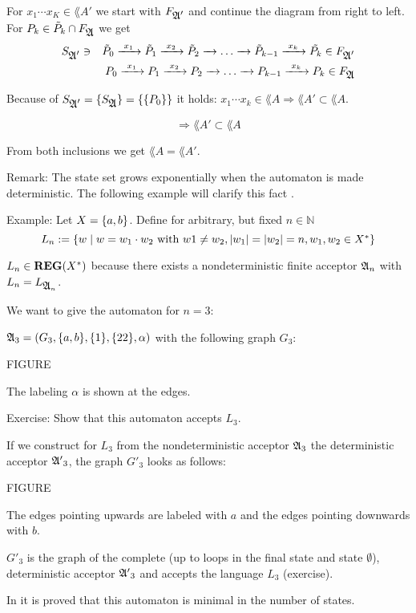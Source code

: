 For $x_1 \cdots x_K \in \lang{A'}$ we start with $F_{\mbox{$\mathfrak{A'}$}}$ and continue
the diagram from right to left. For $P_k \in \tilde{P}_k \cap F_{\mbox{$\mathfrak{A}$}}$ we get
\begin{eqnarray*}
 & S_{\mbox{$\mathfrak{A'}$}} \ni & \tilde{P}_0 \xrightarrow{\ {x_1}\ } \tilde{P}_1 \xrightarrow{\ {x_2}\ } \tilde{P}_2 \xrightarrow{\ {}\ } \ldots
 \xrightarrow{\ {}\ } \tilde{P}_{k-1} \xrightarrow{\ {x_k}\ } \tilde{P_k} \in F_{\mbox{$\mathfrak{A'}$}} \\
 & & P_0 \xrightarrow{\ {x_1}\ } P_1 \xrightarrow{\ {x_2}\ } P_2 \xrightarrow{\ {}\ } \ldots \xrightarrow{\ {}\ }
 P_{k-1} \xrightarrow{\ {x_k}\ } P_k \in F_{\mbox{$\mathfrak{A}$}} 
\end{eqnarray*}

Because of $S_{\mbox{$\mathfrak{A'}$}} = \mbox{$\{S_{\mbox{$\mathfrak{A}$}}\}$} = \mbox{$\{\mbox{$\{P_0\}$}\}$}$ it holds:
$x_1 \cdots x_k \in \lang{A} \Rightarrow \lang{A'} \subset \lang{A}$.

\[ \Rightarrow \lang{A'} \subset \lang{A}\]

From both inclusions we get $\lang{A} = \lang{A'}$.

Remark: The state set grows exponentially when the automaton is made
deterministic. The following example will clarify this fact \cite{Commentz}.

Example: Let $X = \mbox{$\{a, b\}$}$. Define for arbitrary, but fixed $n \in
\mathbb{N}$ \[ L_n := \mbox{$\{w \mid w = w_1 \cdot w_2 \mbox{ with } w1 \neq w_2,
|w_1| = |w_2| = n, w_1, w_2 \in X^*\}$} \]

$L_n \in \mbox{{\bf REG}}(X^*)$ because there exists a nondeterministic finite acceptor
$\mbox{$\mathfrak{A}$}_{n}$ with $L_n = L_{\mbox{$\mathfrak{A}$}_{n}}$.

We want to give the automaton for $n = 3$:

$\mbox{$\mathfrak{A}$}_3 = (G_3, \mbox{$\{a,b\}$}, \mbox{$\{1\}$}, \mbox{$\{22\}$}, \alpha)$ with the
following graph $G_3$:

FIGURE

The labeling $\alpha$ is shown at the edges.

Exercise: Show that this automaton accepts $L_3$.

If we construct for $L_3$ from the nondeterministic acceptor $\mbox{$\mathfrak{A}$}_3$
the deterministic acceptor $\mbox{$\mathfrak{A'}$}_3$, the graph $G'_3$ looks as follows:

FIGURE

The edges pointing upwards are labeled with $a$ and the edges pointing downwards
with $b$.

$G'_3$ is the graph of the complete (up to loops in the final state and state
$\emptyset$), deterministic acceptor $\mbox{$\mathfrak{A'}$}_3$ and accepts the language $L_3$
(exercise).

In \cite{Commentz} it is proved that this automaton is minimal in the number of
states.

